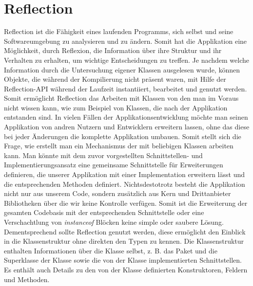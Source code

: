 \section{Reflection} 
\label{sec:reflaction}
Reflection ist die Fähigkeit eines laufenden Programms, sich selbst und seine Softwareumgebung zu analysieren und zu ändern. 
Somit hat die Applikation eine Möglichkeit, durch Reflexion, die Information über ihre Struktur und ihr Verhalten zu erhalten, um wichtige Entscheidungen zu treffen. \newline
Je nachdem welche Information durch die Untersuchung eigener Klassen ausgelesen wurde, können Objekte, die während der Kompilierung nicht präsent waren, mit Hilfe der Reflection-API während der Laufzeit instantiiert, bearbeitet und genutzt werden. Somit ermöglicht Reflection das Arbeiten mit Klassen von den man im Voraus nicht wissen kann, wie zum Beispiel von Klassen, die nach der Applikation entstanden sind.
\bigbreak
In vielen Fällen der Applikationsentwicklung möchte man seinen Applikation von andren Nutzern und Entwicklern erweitern lassen, ohne das diese bei jeder Änderungen die komplette Applikation umbauen. 
Somit stellt sich die Frage, wie erstellt man ein Mechanismus der mit beliebigen Klassen arbeiten kann.
Man könnte mit dem zuvor vorgestellten Schnittstellen- und Implementierungsansatz eine gemeinsame Schnittstelle für Erweiterungen definieren, die unserer Applikation mit einer Implementation erweitern lässt und die entsprechenden Methoden definiert. 
Nichtsdestotrotz besteht die Applikation nicht nur aus unserem Code, sondern zusätzlich aus Kern und Drittanbieter Bibliotheken über die wir keine Kontrolle verfügen.
Somit ist die Erweiterung der gesamten Codebasis mit der entsprechenden Schnittstelle oder eine Verschachtlung von \textit{instanceof} Blöcken keine simple oder saubere Lösung. 
Dementsprechend sollte Reflection genutzt werden, diese ermöglicht den Einblick in die Klassenstruktur ohne direkten den Typen zu kennen. Die Klassenstruktur enthalten Informationen über die Klasse selbst, z. B. das Paket und die Superklasse der Klasse sowie die von der Klasse implementierten Schnittstellen. Es enthält auch Details zu den von der Klasse definierten Konstruktoren, Feldern und Methoden.
\bigbreak

